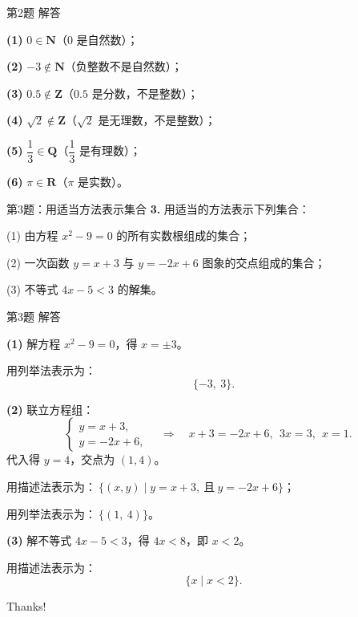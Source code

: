 \documentclass[10pt,aspectratio=169,serif]{beamer}
\begin{document}
\begin{frame}[t]{第2题 解答}
\begin{tcolorbox}[colback=orange!10,colframe=orange,title=\textbf{解}]
\textbf{(1)} $0 \in \mathbf{N}$（$0$ 是自然数）；

\textbf{(2)} $-3 \notin \mathbf{N}$（负整数不是自然数）；

\textbf{(3)} $0.5 \notin \mathbf{Z}$（$0.5$ 是分数，不是整数）；

\textbf{(4)} $\sqrt{2} \notin \mathbf{Z}$（$\sqrt{2}$ 是无理数，不是整数）；

\textbf{(5)} $\dfrac{1}{3} \in \mathbf{Q}$（$\dfrac{1}{3}$ 是有理数）；

\textbf{(6)} $\pi \in \mathbf{R}$（$\pi$ 是实数）。
\end{tcolorbox}
\end{frame}

\begin{frame}[t]{第3题：用适当方法表示集合}
\textbf{3.} 用适当的方法表示下列集合：

\vspace{0.5em}
(1) 由方程 $x^2 - 9 = 0$ 的所有实数根组成的集合；

\vspace{0.5em}
(2) 一次函数 $y = x + 3$ 与 $y = -2x + 6$ 图象的交点组成的集合；

\vspace{0.5em}
(3) 不等式 $4x - 5 < 3$ 的解集。
\end{frame}

\begin{frame}[t]{第3题 解答}
\begin{tcolorbox}[colback=orange!10,colframe=orange,title=\textbf{解}]
\textbf{(1)} 解方程 $x^2 - 9 = 0$，得 $x = \pm 3$。

用列举法表示为：
\[
\quad \{-3,\ 3\}.
\]

\vspace{0.5em}
\textbf{(2)} 联立方程组：
\[
\begin{cases}
y = x + 3,\\
y = -2x + 6,
\end{cases}
\quad\Rightarrow\quad x + 3 = -2x + 6,\ \ 3x = 3,\ \ x = 1.
\]
代入得 $y = 4$，交点为 $(1, 4)$。

用描述法表示为：$\ \{(x, y) \mid y = x + 3,\ \text{且}\ y = -2x + 6\}$；

用列举法表示为：$\ \{(1,\ 4)\}$。

\vspace{0.5em}
\textbf{(3)} 解不等式 $4x - 5 < 3$，得 $4x < 8$，即 $x < 2$。

用描述法表示为：
\[
\quad \{x \mid x < 2\}.
\]
\end{tcolorbox}
\end{frame}

\begin{frame}[c]
  \begin{center}
    {\Huge\calligra Thanks!}
  \end{center}
\end{frame}
\end{document}
